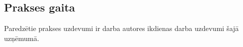 \subsection{Prakses gaita}
Paredzētie prakses uzdevumi ir darba autores ikdienas darba uzdevumi šajā uzņēmumā.